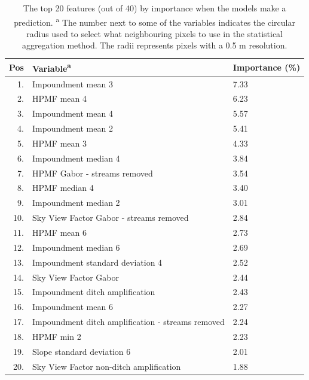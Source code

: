 \documentclass[11pt, review]{elsarticle} %
\begin{document}
\begin{table} [H]
        {\begin{tabular}{r|ll}
          Pos & Variable\textsuperscript{a} & Importance (\%) \\
          \hline
          1.  & Impoundment mean 3                                  & 7.33\\
          2.  & HPMF mean 4                                         & 6.23\\
          3.  & Impoundment mean 4                                  & 5.57\\
          4.  & Impoundment mean 2                                  & 5.41\\
          5.  & HPMF mean 3                                         & 4.33\\
          6.  & Impoundment median 4                                & 3.84\\
          7.  & HPMF Gabor - streams removed                        & 3.54\\
          8.  & HPMF median 4                                       & 3.40\\
          9.  & Impoundment median 2                                & 3.01\\
          10. & Sky View Factor Gabor - streams removed             & 2.84\\
          11. & HPMF mean 6                                         & 2.73\\
          12. & Impoundment median 6                                & 2.69\\
          13. & Impoundment standard deviation 4                    & 2.52\\
          14. & Sky View Factor Gabor                               & 2.44\\
          15. & Impoundment ditch amplification                     & 2.43\\
          16. & Impoundment mean 6                                  & 2.27\\
          17. & Impoundment ditch amplification - streams removed   & 2.24\\
          18. & HPMF min 2                                          & 2.23\\
          19. & Slope standard deviation 6                          & 2.01\\
          20. & Sky View Factor non-ditch amplification             & 1.88\\
          \hline
        \end{tabular}}
        \caption{The top 20 features (out of 40) by importance when the models make a prediction. \newline \textsuperscript{a} The number next to some of the variables indicates the circular radius used to select what neighbouring pixels to use in the statistical aggregation method. The radii represents pixels with a 0.5 m resolution.}
    \label{featureimportancetable}
\end{table}
\clearpage
\end{document}
